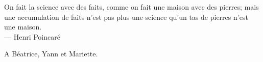 \thispagestyle{empty}
{}

\vspace*{3cm}

\begin{center}
On fait la science avec des faits, comme on fait une maison avec des pierres; mais une accumulation de faits n'est pas plus une science qu'un tas de pierres n'est une maison. \\ \medskip
--- Henri Poincaré 
\end{center}

\vspace*{6cm}

\begin{flushright}
A Béatrice, Yann et Mariette.
\end{flushright}
